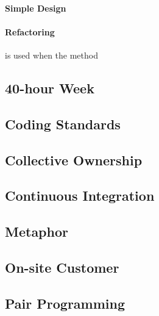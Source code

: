 \paragraph{Simple Design} 

\paragraph{Refactoring} is used when the method 






























\subsection{40-hour Week}

\subsection{Coding Standards}

\subsection{Collective Ownership}

\subsection{Continuous Integration}

\subsection{Metaphor}

\subsection{On-site Customer}

\subsection{Pair Programming}

